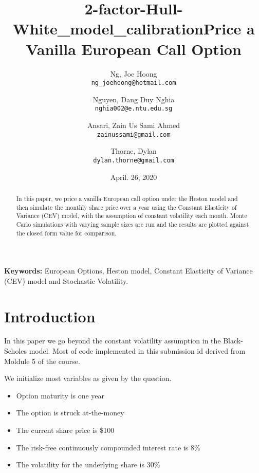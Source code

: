 \documentclass[11pt]{article}
\title{2-factor-Hull-White\_model\_calibration}
\begin{document}
\nocite{*} %

\title{Price a Vanilla European Call Option}

\author{
  Ng, Joe Hoong\\
  \texttt{ng\_joehoong@hotmail.com}
  \and
  Nguyen, Dang Duy Nghia \\
  \texttt{nghia002@e.ntu.edu.sg}
   \and
  Ansari, Zain Us Sami Ahmed \\
  \texttt{zainussami@gmail.com}  
   \and
   Thorne, Dylan \\
  \texttt{dylan.thorne@gmail.com}  
  }

\date{April. 26, 2020} %
\maketitle

\noindent
\textbf{Keywords:} European Options, Heston model,  Constant Elasticity of Variance (CEV) model and Stochastic Volatility.



\begin{abstract}
    In this paper, we price a vanilla European call option under the Heston model and then simulate the monthly share price over a year using the Constant Elasticity of Variance (CEV) model, with the assumption of constant volatility each month. Monte Carlo simulations with varying sample sizes are run and the results are plotted against the closed form value for comparison.
\end{abstract}

\section{Introduction
}

In this paper we go beyond the constant volatility assumption in the Black-Scholes model.  Most of code implemented in this submission id derived from Moldule 5 \cite{M5} of the course. 

We initialize most variables as given by the question. 

\begin{itemize}
    \item Option maturity is one year
    \item The option is struck at-the-money
    \item The current share price is \$100
    \item The risk-free continuously compounded interest rate is 8\%
    \item The volatility for the underlying share is 30\%
\end{itemize}
\end{document}
